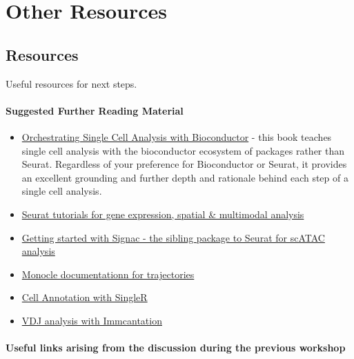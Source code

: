 \documentclass[
]{book}
\providecommand{\tightlist}{%
  \setlength{\itemsep}{0pt}\setlength{\parskip}{0pt}}
\begin{document}
\hypertarget{part-other-resources}{%
\part{Other Resources}\label{part-other-resources}}

\hypertarget{resources}{%
\chapter{Resources}\label{resources}}

Useful resources for next steps.

\hypertarget{suggested-further-reading-material}{%
\subsection{Suggested Further Reading Material}\label{suggested-further-reading-material}}

\begin{itemize}
\tightlist
\item
  \href{https://bioconductor.org/books/release/OSCA/}{Orchestrating Single Cell Analysis with Bioconductor} - this book teaches single cell analysis with the bioconductor ecosystem of packages rather than Seurat. Regardless of your preference for Bioconductor or Seurat, it provides an excellent grounding and further depth and rationale behind each step of a single cell analysis.
\item
  \href{https://satijalab.org/seurat/articles/get_started.html}{Seurat tutorials for gene expression, spatial \& multimodal analysis}
\item
  \href{https://satijalab.org/signac/articles/overview.html}{Getting started with Signac - the sibling package to Seurat for scATAC analysis}
\item
  \href{https://cole-trapnell-lab.github.io/monocle3/docs/trajectories/}{Monocle documentationn for trajectories}
\item
  \href{http://bioconductor.org/books/devel/SingleRBook/}{Cell Annotation with SingleR}
\item
  \href{https://immcantation.readthedocs.io/en/stable/}{VDJ analysis with Immcantation}
\end{itemize}

\hypertarget{useful-links-arising-from-the-discussion-during-the-previous-workshop}{%
\subsection{Useful links arising from the discussion during the previous workshop}\label{useful-links-arising-from-the-discussion-during-the-previous-workshop}}
\end{document}
